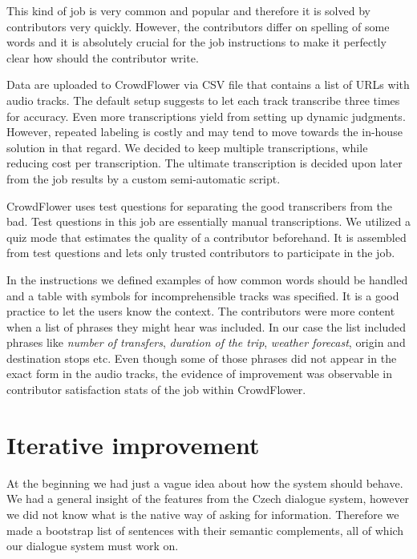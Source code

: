 This kind of job is very common and popular and therefore it is solved by contributors very quickly.
However, the contributors differ on spelling of some words and it is absolutely crucial for the job instructions to make it perfectly clear how should the contributor write.

Data are uploaded to CrowdFlower via CSV file that contains a list of URLs with audio tracks.
The default setup suggests to let each track transcribe three times for accuracy.
Even more transcriptions yield from setting up dynamic judgments.
However, repeated labeling is costly and may tend to move towards the in-house solution in that regard. %
We decided to keep multiple transcriptions, while reducing cost per transcription.
The ultimate transcription is decided upon later from the job results by a custom semi-automatic script.

CrowdFlower uses test questions for separating the good transcribers from the bad.
Test questions in this job are essentially manual transcriptions.
We utilized a quiz mode that estimates the quality of a contributor beforehand.
It is assembled from test questions and lets only trusted contributors to participate in the job.

In the instructions we defined examples of how common words should be handled and a table with symbols for incomprehensible tracks was specified.
It is a good practice to let the users know the context.
The contributors were more content when a list of phrases they might hear was included.%
In our case the list included phrases like \textit{number of transfers}, \textit{duration of the trip}, \textit{weather forecast}, origin and destination stops etc.
Even though some of those phrases did not appear in the exact form in the audio tracks, the evidence of improvement was observable in contributor satisfaction stats of the job within CrowdFlower.

\section{Iterative improvement}

At the beginning we had just a vague idea about how the system should behave.
We had a general insight of the features from the Czech dialogue system, however we did not know what is the native way of asking for information. %
Therefore we made a bootstrap list of sentences with their semantic complements, all of which our dialogue system must work on.

